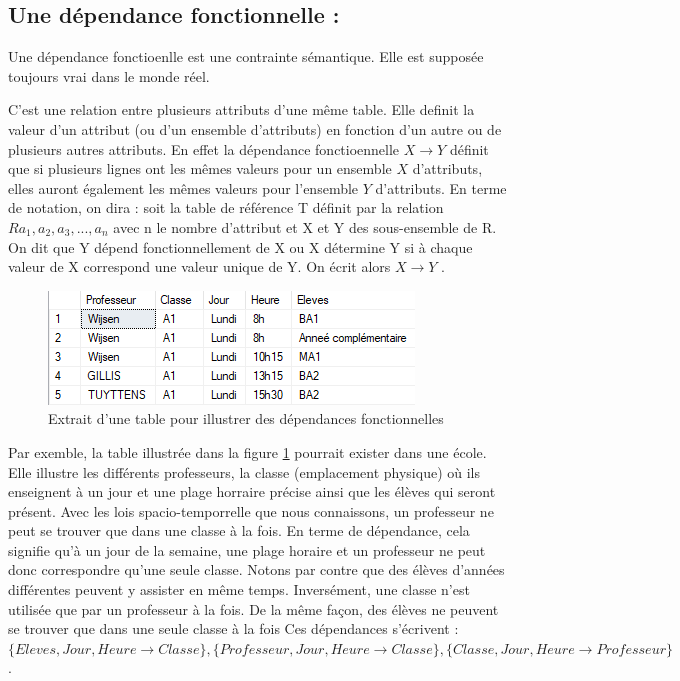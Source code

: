 \documentclass[12pt, a4paper, oneside, titlepage]{book}%
\begin{document}
\subsection{Une dépendance fonctionnelle : }
Une dépendance fonctioenlle est une contrainte sémantique. Elle est supposée toujours vrai dans le monde réel.

C'est une relation entre plusieurs attributs d'une même table. Elle definit la valeur d'un attribut (ou d'un ensemble d'attributs) en fonction d'un autre ou de plusieurs autres attributs. En effet la dépendance fonctioennelle $ X \rightarrow Y$ définit que si plusieurs lignes ont les mêmes valeurs pour un ensemble $X$ d'attributs, elles auront également les mêmes valeurs pour l'ensemble $Y$ d'attributs.
En terme de notation, on dira : soit la table de référence T définit par la relation $R{a_1, a_2, a_3,...,a_n}$ avec n le nombre d'attribut et X et Y des sous-ensemble de R. On dit que \og Y dépend fonctionnellement de X \fg ou \og X détermine Y \fg si à chaque valeur de X correspond une valeur unique de Y. On écrit alors \og $ X \rightarrow Y$ \fg.

\begin{figure}[ht]
	\center
	\includegraphics{DF.png}
	\caption{\label{picDF} Extrait d'une table pour illustrer des dépendances fonctionnelles}
\end{figure}

Par exemble, la table illustrée dans la figure \ref{picDF} pourrait exister dans une école. Elle illustre les différents professeurs, la classe (emplacement physique) où ils enseignent à un jour et une plage horraire précise ainsi que les élèves qui seront présent. Avec les lois spacio-temporrelle que nous connaissons, un professeur ne peut se trouver que dans une classe à la fois. En terme de dépendance, cela signifie qu'à un jour de la semaine, une plage horaire et un professeur ne peut donc correspondre qu'une seule classe. Notons par contre que des élèves d'années différentes peuvent y assister en même temps. Inversément, une classe n'est utilisée que par un professeur à la fois. De la même façon, des élèves ne peuvent se trouver que dans une seule classe à la fois
Ces dépendances s'écrivent : $\{Eleves, Jour, Heure \rightarrow Classe\}, \{Professeur, Jour, Heure \rightarrow Classe\}, \{Classe, Jour, Heure \rightarrow Professeur\}$.
\end{document}
